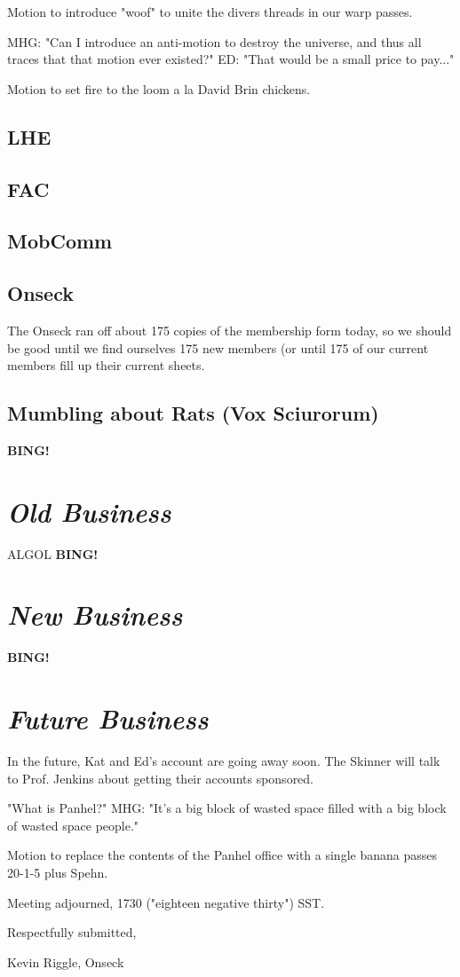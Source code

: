 \documentclass[10pt]{article}
\newcommand{\bing}{{\bf BING!} }
\newcommand{\goto}[1]{\bing \vskip 12pt \section*{{\em{#1}}}}
\newcommand{\ps}{ plus Spehn\xspace}
\begin{document}
Motion to introduce "woof" to unite the divers threads in our warp passes.

MHG: "Can I introduce an anti-motion to destroy the universe, and thus all traces that that motion
ever existed?"
ED: "That would be a small price to pay..."

Motion to set fire to the loom a la David Brin chickens.

\subsection*{LHE}

\subsection*{FAC}

\subsection*{MobComm}

\subsection*{Onseck}
The Onseck ran off about 175 copies of the membership form today, so we should be good until
we find ourselves 175 new members (or until 175 of our current members fill up their current sheets.

\subsection*{Mumbling about Rats (Vox Sciurorum)}

\goto{Old Business}

ALGOL
\goto{New Business}

\goto{Future Business}
In the future, Kat and Ed's account are going away soon.  The Skinner will talk to Prof. Jenkins
about getting their accounts sponsored.

"What is Panhel?"
MHG: "It's a big block of wasted space filled with a big block of wasted space people."

Motion to replace the contents of the Panhel office with a single banana passes 20-1-5\ps.

\vspace{12pt}

\noindent
Meeting adjourned, 1730 ("eighteen negative thirty") SST.

\vspace{18pt}

\centerline{Respectfully submitted,}
\centerline{Kevin Riggle, Onseck}
\end{document}
